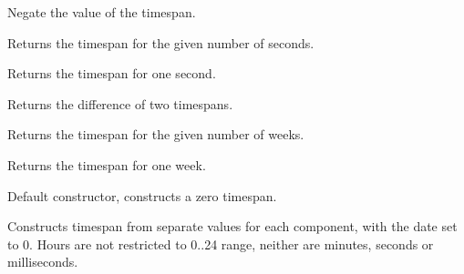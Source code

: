 Negate the value of the timespan.

\label{wxtimespanseconds}


Returns the timespan for the given number of seconds.

\label{wxtimespansecond}


Returns the timespan for one second.

\label{wxtimespansubtract}




Returns the difference of two timespans.

\label{wxtimespanweeks}


Returns the timespan for the given number of weeks.

\label{wxtimespanweek}


Returns the timespan for one week.

\label{wxtimespanctor}


Default constructor, constructs a zero timespan.


Constructs timespan from separate values for each component, with the date
set to 0. Hours are not restricted to 0..24 range, neither are
minutes, seconds or milliseconds.

